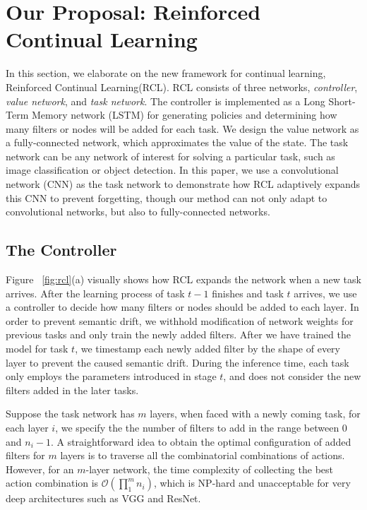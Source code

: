 \documentclass{article}
\begin{document}
\section{Our Proposal: Reinforced Continual Learning}
\label{sec:rcl}
In this section, we elaborate on the new framework for continual learning, Reinforced Continual Learning(RCL). RCL consists of three networks,  \emph{controller},  \emph{value network}, and  \emph{ task network}.  The controller is implemented as a Long Short-Term Memory network (LSTM) for generating policies and determining how many filters or nodes will be added for each task. We design the value network as a fully-connected network, which approximates the value of the state. The task network can be any network of interest for solving a particular task, such as image classification or object detection.  In this paper, we  use a convolutional network (CNN) as the task network to demonstrate how RCL adaptively expands this CNN to prevent forgetting, though our method can not only adapt to convolutional networks, but also to fully-connected networks.


\subsection{The Controller}
Figure ~\ref{fig:rcl}(a) visually shows how RCL expands the network when a new task arrives. After the learning process of task $t-1$ finishes and task $t$ arrives, we use a controller to decide how many filters or nodes should be added to each layer. In order to prevent semantic drift, we withhold modification of network weights for previous tasks and only train the newly added filters. After we have trained the model for task $t$, we timestamp each newly added filter by the shape of every layer to prevent the caused semantic drift. During the inference time, each task only employs the parameters introduced in stage $t$,  and does not consider the new filters added in the later tasks.


Suppose the task network has $m$ layers, when faced with a newly coming task, for each layer $i$, we specify the the number of filters to add in the range between $0$ and $n_i-1$. A straightforward idea to obtain the optimal configuration of added filters for  $m$ layers  is to traverse all the  combinatorial combinations of actions. However, for an $m$-layer network, the time complexity of collecting the best action combination is $\mathcal{O}(\prod_1^m n_i)$, which is NP-hard and unacceptable for very deep architectures such as VGG and ResNet.
\end{document}
